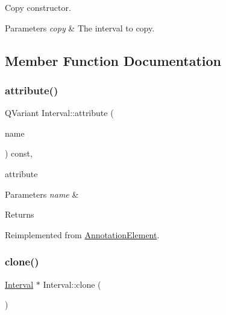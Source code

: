 Copy constructor. 


\begin{DoxyParams}{Parameters}
{\em copy} & The interval to copy. \\
\hline
\end{DoxyParams}


\subsection{Member Function Documentation}
\mbox{\label{class_interval_aebcaee36c1adf49669d8a0faa16a335f}} 
\subsubsection{\texorpdfstring{attribute()}{attribute()}}
{\footnotesize\ttfamily Q\+Variant Interval\+::attribute (\begin{DoxyParamCaption}\item[{const Q\+String \&}]{name }\end{DoxyParamCaption}) const\hspace{0.3cm}{\ttfamily [override]}, {\ttfamily [virtual]}}



attribute 


\begin{DoxyParams}{Parameters}
{\em name} & \\
\hline
\end{DoxyParams}
\begin{DoxyReturn}{Returns}

\end{DoxyReturn}


Reimplemented from \hyperlink{class_annotation_element_a55f85fb15ed52122653b0769c857899c}{Annotation\+Element}.

\mbox{\label{class_interval_a19000e776f0533de156ce3ab9a6313dc}} 
\subsubsection{\texorpdfstring{clone()}{clone()}}
{\footnotesize\ttfamily \hyperlink{class_interval}{Interval} $\ast$ Interval\+::clone (\begin{DoxyParamCaption}{ }\end{DoxyParamCaption})}



